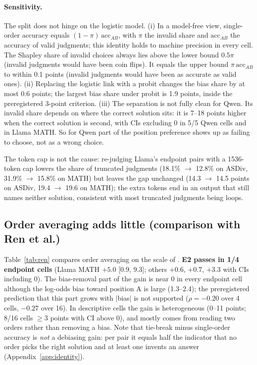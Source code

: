\documentclass[11pt]{article}
\begin{document}
\begin{table}[t]
\centering\small
\caption{Four-factor Shapley split of the gap $R-$single-order accuracy (\texttt{base} judge, points).
``Valid'' = share of judgments with a valid choice. Gap with 95\% problem-clustered bootstrap CI. Exploratory.}
\label{tab:decomp}

\end{table}

\paragraph{Sensitivity.} The split does not hinge on the logistic model. (i) In a model-free view,
single-order accuracy equals $(1-\pi)\,\mathrm{acc}_{AB}$, with $\pi$ the invalid share and
$\mathrm{acc}_{AB}$ the accuracy of valid judgments; this identity holds to machine precision in every cell.
The Shapley share of invalid choices always lies above the lower bound $0.5\pi$ (invalid judgments would have
been coin flips). It equals the upper bound $\pi\,\mathrm{acc}_{AB}$ to within 0.1 points (invalid judgments
would have been as accurate as valid ones). (ii) Replacing the logistic link with a probit changes the bias
share by at most 0.6 points; the largest bias share under probit is 1.9 points, inside the preregistered
3-point criterion. (iii) The separation is not fully clean for Qwen. Its invalid share depends on where the
correct solution sits: it is 7--18 points higher when the correct solution is second, with CIs excluding 0 in
5/5 Qwen cells and in Llama MATH. So for Qwen part of the position preference shows up as failing to choose,
not as a wrong choice.

The token cap is not the cause: re-judging Llama's endpoint pairs with a 1536-token cap lowers the share of
truncated judgments (18.1\% $\to$ 12.8\% on ASDiv, 31.9\% $\to$ 15.8\% on MATH) but leaves the gap unchanged (14.3 $\to$ 14.5 points on ASDiv, 19.4 $\to$ 19.6 on MATH);
the extra tokens end in an output that still names neither solution, consistent with most truncated judgments
being loops.

\subsection{Order averaging adds little (comparison with Ren et al.)}
Table~\ref{tab:ren} compares order averaging on the scale of \citet{ren2023selfeval}. \textbf{E2 passes in
1/4 endpoint cells} (Llama MATH $+5.0$ [0.9, 9.3]; others $+0.6$, $+0.7$, $+3.3$ with CIs including 0). The
bias-removal part of the gain is near 0 in every endpoint cell although the log-odds bias toward position A is
large (1.3--2.4); the preregistered prediction that this part grows with $|$bias$|$ is not supported
($\rho=-0.20$ over 4 cells, $-0.27$ over 16). In descriptive cells the gain is heterogeneous (0--11 points;
8/16 cells $\geq$3 points with CI above 0), and mostly comes from reading two orders rather than removing a
bias. Note that tie-break minus single-order accuracy is \emph{not} a debiasing gain: per pair it equals half
the indicator that no order picks the right solution and at least one invents an answer
(Appendix~\ref{app:identity}).
\end{document}
